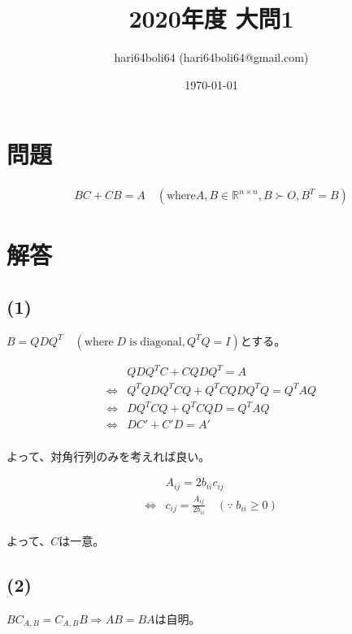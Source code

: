\documentclass[a4paper, 10pt, dvipdfmx]{jlreq}
\begin{document}
\title{2020年度 大問1}
\author{hari64boli64 (hari64boli64@gmail.com)}
\date{\today}
\maketitle


\section{問題}

\begin{align*}
  BC+CB=A \quad (\mathrm{where} A,B \in \mathbb{R}^{n\times n}, B\succ O, B^T=B)
\end{align*}

\section{解答}

\subsection*{(1)}

$B=QDQ^T \quad (\mathrm{where} \; D \; \mathrm{is}\; \mathrm{diagonal}, Q^TQ=I)$とする。

\begin{align*}
                  & QDQ^TC+CQDQ^T=A             \\
  \Leftrightarrow & Q^TQDQ^TCQ+Q^TCQDQ^TQ=Q^TAQ \\
  \Leftrightarrow & DQ^TCQ+Q^TCQD=Q^TAQ         \\
  \Leftrightarrow & DC'+C'D=A'                  \\
\end{align*}

よって、対角行列のみを考えれば良い。

\begin{align*}
                  & A_{ij}=2b_{ii}c_{ij}                                           \\
  \Leftrightarrow & c_{ij}=\frac{A_{ij}}{2b_{ii}}\quad (\because \; b_{ii} \geq 0) \\
\end{align*}

よって、$C$は一意。

\subsection*{(2)}

$BC_{A,B}=C_{A,B}B \Rightarrow AB=BA$は自明。
\end{document}
